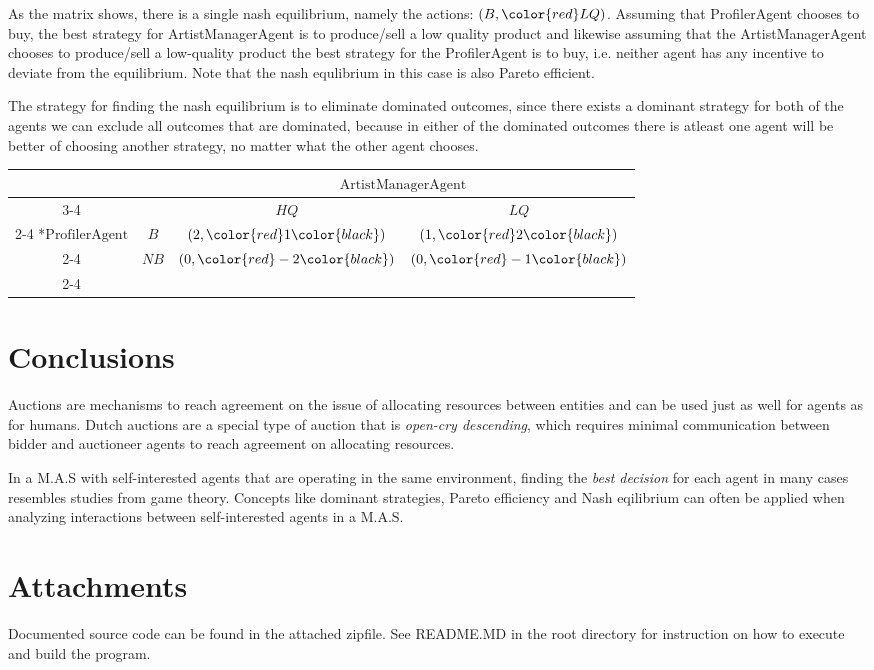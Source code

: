 \documentclass[a4paper, 11pt]{article}
\begin{document}
As the matrix shows, there is a single nash equilibrium, namely the actions: $(B, \color{red}LQ)$. Assuming that ProfilerAgent chooses to buy, the best strategy for ArtistManagerAgent is to produce/sell a low quality product and likewise assuming that the ArtistManagerAgent chooses to produce/sell a low-quality product the best strategy for the ProfilerAgent is to buy, i.e. neither agent has any incentive to deviate from the equilibrium. Note that the nash equlibrium in this case is also Pareto efficient.

The strategy for finding the nash equilibrium is to eliminate dominated outcomes, since there exists a dominant strategy for both of the agents we can exclude all outcomes that are dominated, because in either of the dominated outcomes there is atleast one agent will be better of choosing another strategy, no matter what the other agent chooses. 

 \begin{table}[H]
    \setlength{\extrarowheight}{2pt}
    \begin{tabular}{*{4}{c|}}
      \multicolumn{2}{c}{} & \multicolumn{2}{c}{\color{red}$\text{ArtistManagerAgent}$}\\\cline{3-4}
      \multicolumn{1}{c}{} &  & $HQ$  & $LQ$ \\\cline{2-4}
      \multirow{2}*{$\text{ProfilerAgent}$}  & $B$ & \st{$(2,\color{red}1\color{black})$} & $(1,\color{red}2\color{black})$ \\\cline{2-4}
      & $NB$ & \st{$(0,\color{red}-2\color{black})$} & \st{$(0,\color{red}-1\color{black})$} \\\cline{2-4}
    \end{tabular}
  \end{table}
\section*{Conclusions}
Auctions are mechanisms to reach agreement on the issue of allocating resources between entities and can be used just as well for agents as for humans. Dutch auctions are a special type of auction that is \textit{open-cry descending}, which requires minimal communication between bidder and auctioneer agents to reach agreement on allocating resources.

In a M.A.S with self-interested agents that are operating in the same environment, finding the  \textit{best decision} for each agent in many cases resembles studies from game theory. Concepts like dominant strategies, Pareto efficiency and Nash eqilibrium can often be applied when analyzing interactions between self-interested agents in a M.A.S.

\section*{Attachments}
Documented source code can be found in the attached zipfile. See README.MD in the root directory for instruction on how to execute and build the program.

{}

\end{document}

